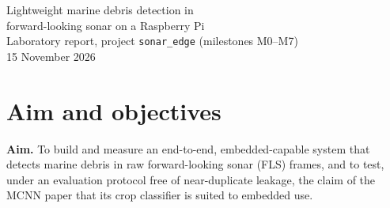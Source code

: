 \documentclass[11pt,a4paper]{article}
\newcommand{\cfg}[1]{\texttt{#1}}
\begin{document}
\begin{center}
  {\LARGE Lightweight marine debris detection in\\[0.2em]
  forward-looking sonar on a Raspberry Pi}\\[0.6em]
  {\large Laboratory report, project \texttt{sonar\_edge} (milestones M0--M7)}\\[0.3em]
  15 November 2026
\end{center}
\vspace{0.3em}

\begin{abstract}
\noindent
A one-stage object detector was trained to find and classify ten kinds of
debris (and the tank walls) in whole forward-looking sonar frames, quantised
to 8-bit integers, and executed by a dependency-free C runtime on a
Raspberry Pi~4. The 1\,868 frames of the public water-tank dataset were
grouped into 191 scenes so that near-identical frames never fall on both
sides of a split, and all accuracy figures are pooled five-fold scene
cross-validation. The deployed network (\cfg{small}, $360 \times 240$
input, \num{42463} parameters, 78~M multiply--accumulates) reaches
52.3 $\pm$ 1.7 mAP@0.5 measured on the Pi over three training seeds, and a
2.6 times costlier variant (\cfg{small\_wide}) 56.7 $\pm$ 2.7. The C
runtime is bit-exact with the Python integer reference on every platform.
A hand-written NEON kernel brings the deployed model to 20.3~ms per frame
on one Cortex-A72 core (49 frames/s; 187 frames/s with four independent
copies) in 2.3~MB of memory. Retrained under the same scene folds, the MCNN
crop classifier of the literature falls from 99.8\,\% to 77.7\,\% accuracy;
on its own task, without being given the object boxes, \cfg{small\_wide}
matches it (77.6\,\%) with 20 times fewer parameters, and the deployed
detector processes a frame 4.5 times faster than MCNN classifies the objects
in it.
\end{abstract}

\tableofcontents
\newpage

\section{Aim and objectives}

\textbf{Aim.} To build and measure an end-to-end, embedded-capable system
that detects marine debris in raw forward-looking sonar (FLS) frames, and
to test, under an evaluation protocol free of near-duplicate leakage, the
claim of the MCNN paper \cite{cimen} that its crop classifier is suited to
embedded use.
\end{document}
